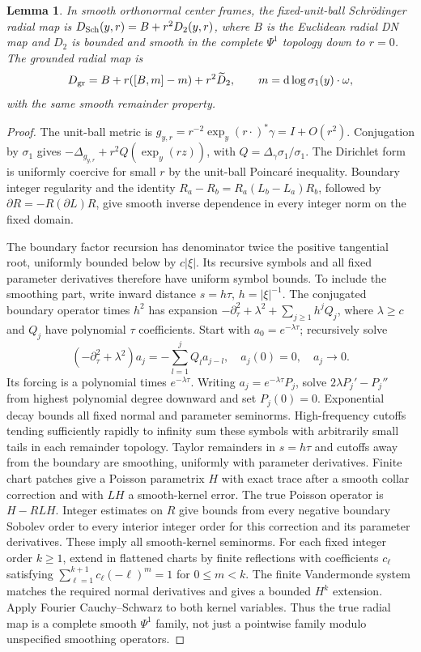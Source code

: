 \documentclass[11pt]{article}
\newtheorem{lemma}[theorem]{Lemma}
\theoremstyle{definition}\newtheorem{definition}[theorem]{Definition}
\theoremstyle{remark}\newtheorem{remark}[theorem]{Remark}
\newcommand{\dd}{\mathrm d}
\begin{document}
\begin{lemma}\label{lem:radial}
In smooth orthonormal center frames, the fixed-unit-ball Schr\"odinger
radial map is $D_{\rm Sch}(y,r)=B+r^2D_2(y,r)$, where $B$ is the Euclidean
radial DN map and $D_2$ is bounded and smooth in the complete $\Psi^1$
topology down to $r=0$. The grounded radial map is
\begin{equation}\label{eq:radial}
 D_{\rm gr}=B+r([B,m]-m)+r^2\widetilde D_2,
 \qquad m=\dd\log\sigma_1(y)\cdot\omega,
\end{equation}
with the same smooth remainder property.
\end{lemma}
\begin{proof}
The unit-ball metric is $g_{y,r}=r^{-2}\exp_y(r\cdot)^*\gamma=I+O(r^2)$.
Conjugation by $\sigma_1$ gives
$-\Delta_{g_{y,r}}+r^2Q(\exp_y(rz))$, with
$Q=\Delta_\gamma\sigma_1/\sigma_1$. The Dirichlet form is uniformly
coercive for small $r$ by the unit-ball Poincar\'e inequality.
Boundary integer regularity and the identity
$R_a-R_b=R_a(L_b-L_a)R_b$, followed by
$\partial R=-R(\partial L)R$, give smooth inverse dependence in every
integer norm on the fixed domain.

The boundary factor recursion \cite[Lemma 3.2 and Proposition 3.3]{Cekic}
has denominator twice the positive tangential root, uniformly bounded
below by $c|\xi|$. Its recursive symbols and all fixed parameter derivatives
therefore have uniform symbol bounds. To include the smoothing part,
write inward distance $s=h\tau$, $h=|\xi|^{-1}$. The conjugated boundary
operator times $h^2$ has expansion
$-\partial_\tau^2+\lambda^2+\sum_{j\ge1}h^jQ_j$, where
$\lambda\ge c$ and $Q_j$ have polynomial $\tau$ coefficients.
Start with $a_0=e^{-\lambda\tau}$; recursively solve
\[
 (-\partial_\tau^2+\lambda^2)a_j
       =-\sum_{l=1}^jQ_la_{j-l},\quad a_j(0)=0,\quad a_j\to0.
\]
Its forcing is a polynomial times $e^{-\lambda\tau}$.
Writing $a_j=e^{-\lambda\tau}P_j$, solve
$2\lambda P_j'-P_j''$ from highest polynomial degree downward and set
$P_j(0)=0$. Exponential decay bounds all fixed normal and parameter
seminorms. High-frequency cutoffs tending sufficiently rapidly to infinity
sum these symbols with arbitrarily small tails in each remainder topology.
Taylor remainders in $s=h\tau$ and cutoffs away from the boundary are
smoothing, uniformly with parameter derivatives. Finite chart patches
give a Poisson parametrix $H$ with exact trace after a smooth collar
correction and with $LH$ a smooth-kernel error.
The true Poisson operator is $H-RLH$. Integer estimates on $R$ give
bounds from every negative boundary Sobolev order to every interior
integer order for this correction and its parameter derivatives.
These imply all smooth-kernel seminorms. For each fixed integer order
$k\ge1$, extend in flattened charts by finite reflections with coefficients
$c_\ell$ satisfying $\sum_{\ell=1}^{k+1}c_\ell(-\ell)^m=1$ for
$0\le m<k$. The finite Vandermonde system matches the required normal
derivatives and gives a bounded $H^k$ extension. Apply Fourier
Cauchy--Schwarz to both kernel variables. Thus the true
radial map is a complete smooth $\Psi^1$ family, not just a pointwise
family modulo unspecified smoothing operators.


\end{proof}
\end{document}
